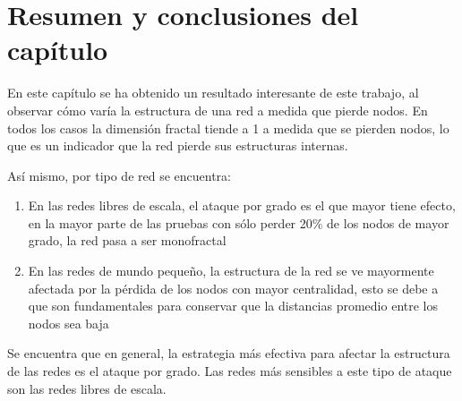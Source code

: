 
\section{Resumen y conclusiones del capítulo}

En este capítulo se ha obtenido un resultado interesante de este trabajo, al observar cómo varía la estructura de una red a medida que pierde nodos. En todos los casos la dimensión fractal tiende a 1 a medida que se pierden nodos, lo que es un indicador que la red pierde sus estructuras internas.

Así mismo, por tipo de red se encuentra:

\begin{enumerate}
    \item En las redes libres de escala, el ataque por grado es el que mayor tiene efecto, en la mayor parte de las pruebas con sólo perder 20\% de los nodos de mayor grado, la red pasa a ser monofractal
    \item En las redes de mundo pequeño, la estructura de la red se ve mayormente afectada por la pérdida de los nodos con mayor centralidad, esto se debe a que son fundamentales para conservar que la distancias promedio entre los nodos sea baja
\end{enumerate}

Se encuentra que en general, la estrategia más efectiva para afectar la estructura de las redes es el ataque por grado. Las redes más sensibles a este tipo de ataque son las redes libres de escala.

